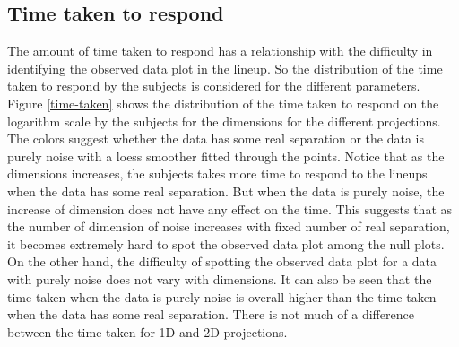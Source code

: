 \documentclass[12]{article}
\begin{document}

\subsection{Time taken to respond}

The amount of time taken to respond has a relationship with the difficulty in identifying the observed data plot in the lineup. So the distribution of the time taken to respond by the subjects is considered for the different parameters. Figure \ref{time-taken} shows the distribution of the time taken to respond on the logarithm scale by the subjects for the dimensions for the different projections. The colors suggest whether the data has some real separation or the data is purely noise with a loess smoother fitted through the points. Notice that as the dimensions increases, the subjects  takes more time to respond to the lineups when the data has some real separation. But when the data is purely noise, the increase of dimension does not have any effect on the time. This suggests that as the number of dimension of noise increases with fixed number of real separation, it becomes extremely hard to spot the observed data plot among the null plots. On the other hand, the difficulty of spotting the observed data plot for a data with purely noise does not vary with dimensions. It can also be seen that the time taken when the data is purely noise is overall higher than the time taken when the data has some real separation. There is not much of a difference between the time taken for 1D and 2D projections.
\end{document}

